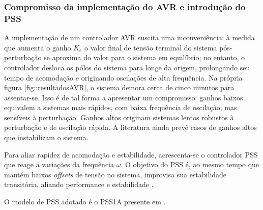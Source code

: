 \documentclass[10pt, compress,xcolor={svgnames,dvipsnames,x11names}]{beamer}
\begin{document}
\begin{frame}%
\frametitle{Compromisso da implementação do AVR e introdução do PSS}
\scriptsize

	A implementação de um controlador AVR suscita uma inconveniência: à medida que aumenta o ganho $K_e$ o valor final de tensão terminal do sistema pós-perturbação se aproxima do valor para o sistema em equilíbrio; no entanto, o controlador desloca os pólos do sistema para longe da origem, prolongando seu tempo de acomodação e originando oscilações de alta frequência. Na própria figura \ref{fig::resultadosAVR}, o sistema demora cerca de cinco minutos para assentar-se. Isso é de tal forma a apresentar um compromisso: ganhos baixos equivalem a sistemas mais rápidos, com baixa frequência de oscilação, mas sensíveis à perturbação. Ganhos altos originam sistemas lentos robustos à perturbação e de oscilação rápida. A literatura ainda prevê casos de ganhos altos que instabilizam o sistema.

	Para aliar rapidez de acomodação e estabilidade, acrescenta-se o controlador PSS que reage a variações da frequência $\omega$. O objetivo do PSS é, ao mesmo tempo que mantém baixos \textit{offsets} de tensão no sistema, improvisa sua estabilidade transitória, aliando performance e estabilidade \cite{kundur}.

	O modelo de PSS adotado é o PSS1A presente em \cite{ieeeStd4215}.

\normalsize
\end{frame}%
\end{document}
